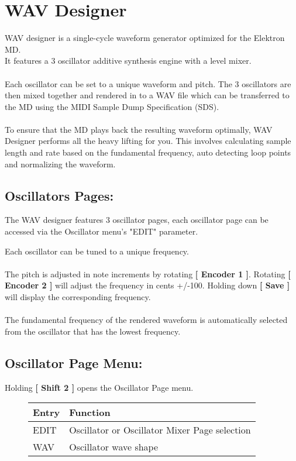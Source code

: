 \chapter{WAV Designer}
WAV designer is a single-cycle waveform generator optimized for the Elektron MD.\\
It features a 3 oscillator additive synthesis engine with a level mixer.\\
\\
Each oscillator can be set to a unique waveform and pitch. The 3 oscillators are then mixed together and rendered in to a WAV file which can be transferred to the MD using the MIDI Sample Dump Specification (SDS).\\
\\
To ensure that the MD plays back the resulting waveform optimally, WAV Designer performs all the heavy lifting for you. This involves calculating sample length and rate based on the fundamental frequency, auto detecting loop points and normalizing the waveform.
\section{Oscillators Pages:}
The WAV designer features 3 oscillator pages, each oscillator page can be accessed via the Oscillator menu's "EDIT" parameter.

Each oscillator can be tuned to a unique frequency.\\
\\The pitch is adjusted in note increments by rotating \textbf{[ Encoder 1 ]}. Rotating \textbf{[ Encoder 2 ]} will adjust the frequency in cents +/-100. Holding down \textbf{[ Save ]} will display the corresponding frequency.\\
\\The fundamental frequency of the rendered waveform is automatically selected from the oscillator that has the lowest frequency.\\

\section{Oscillator Page Menu:}
Holding \textbf{[ Shift 2 ]} opens the Oscillator Page menu.
\begin{figure}[hb]
    \begin{tabular}{|l|l|}
    \hline
    \rowcolor[HTML]{C0C0C0}
    Entry     & Function \\ \hline
    EDIT      & Oscillator or Oscillator Mixer Page selection \\ \hline
    WAV       & Oscillator wave shape\\ \hline
    \end{tabular}
\end{figure}
\newpage
{}

